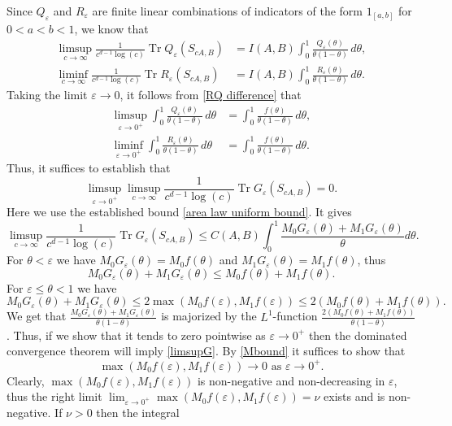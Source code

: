 \documentclass[12pt]{amsart}
\numberwithin{equation}{section}
\newcommand{\eps}{\varepsilon}
\begin{document}
Since $Q_\eps$ and $R_\eps$ are finite linear combinations of indicators of the form $1_{[a,b]}$ for $0 < a < b < 1$, we know that 
\begin{align*}
\limsup_{c\to \infty}\frac{1}{c^{d-1}\log(c)}\operatorname{Tr}Q_{\eps}(S_{cA,B}) &= I(A,B)\int_0^1 \frac{Q_\eps(\theta)}{\theta(1-\theta)}\,d\theta,\\
\liminf_{c\to \infty}\frac{1}{c^{d-1}\log(c)}\operatorname{Tr}R_{\eps}(S_{cA,B}) &= I(A,B)\int_0^1 \frac{R_\eps(\theta)}{\theta(1-\theta)}\,d\theta.
\end{align*}
Taking the limit $\eps \to 0$, it follows from \eqref{RQ difference} that
\begin{align*}
\limsup_{\eps \to 0^+} \int_0^1 \frac{Q_\eps(\theta)}{\theta(1-\theta)}\,d\theta &= \int_0^1 \frac{f(\theta)}{\theta(1-\theta)}\, d\theta,\\
\liminf_{\eps \to 0^+} \int_0^1\frac{R_\eps(\theta)}{\theta(1-\theta)}\,d\theta &= \int_0^1 \frac{f(\theta)}{\theta(1-\theta)}\, d\theta.
\end{align*}
Thus, it suffices to establish that 
\begin{equation}\label{limsupG}\limsup_{\eps \to 0^+} \limsup_{c\to\infty} \frac{1}{c^{d-1}\log(c)}\operatorname{Tr} G_\eps(S_{cA,B}) = 0.
\end{equation}
Here we use the established bound \eqref{area law uniform bound}. It gives 
$$\limsup_{c\to \infty}\frac{1}{c^{d-1}\log(c)}\operatorname{Tr} G_\eps(S_{cA,B})  \leq C(A,B) \int_0^1 \frac{M_0G_\eps(\theta)+M_1G_\eps(\theta)}{\theta}d\theta.$$
For $\theta < \eps$ we have $M_0G_\eps(\theta) = M_0f(\theta)$ and $M_1G_\eps(\theta) = M_1f(\theta)$, thus $$M_0G_\eps(\theta)+M_1G_\eps(\theta) \le M_0f(\theta)+M_1f(\theta).$$ For $\eps \le \theta < 1$ we have 
\begin{equation}\label{Mbound}
M_0 G_\eps(\theta) + M_1G_\eps(\theta) \le 2\max(M_0f(\eps), M_1f(\eps)) \le 2(M_0f(\theta)+ M_1f(\theta)).
\end{equation}
We get that $\frac{M_0 G_\eps(\theta) + M_1G_\eps(\theta)}{\theta(1-\theta)}$ is majorized by the $L^1$-function $\frac{2(M_0f(\theta)+ M_1f(\theta))}{\theta(1-\theta)}$. Thus, if we show that it tends to zero pointwise as $\eps \to 0^+$ then the dominated convergence theorem will imply \eqref{limsupG}. By \eqref{Mbound} it suffices to show that 
\begin{equation}\label{cont at 0}
\max(M_0f(\eps), M_1f(\eps))\to 0 \text{ as } \eps \to 0^+.
\end{equation}
Clearly, $\max(M_0f(\eps), M_1f(\eps))$ is non-negative and non-decreasing in $\eps$, thus the right limit $\lim_{\eps \to 0^+}\max(M_0f(\eps), M_1f(\eps)) = \nu$ exists and is non-negative. If $\nu > 0$ then the integral
\end{document}
